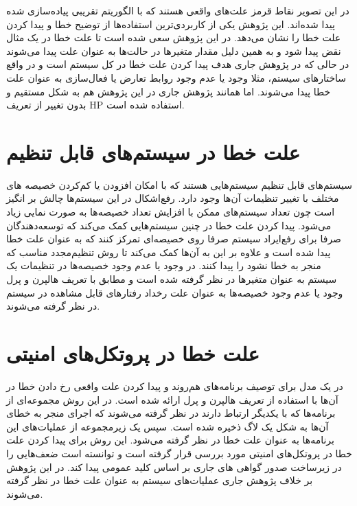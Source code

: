 در این تصویر نقاط قرمز علت‌های واقعی هستند که با الگوریتم تقریبی پیاده‌سازی شده پیدا شده‌اند.
 این پژوهش یکی از کاربردی‌ترین استفاده‌ها از توضیح خطا و پیدا کردن علت خطا را نشان می‌دهد. 
در این پژوهش سعی شده است تا علت خطا در یک مثال نقض پیدا شود و به همین دلیل مقدار متغیر‌ها در حالت‌ها به عنوان علت پیدا می‌شوند در حالی که در پژوهش جاری هدف پیدا کردن علت خطا در کل سیستم است و در واقع ساختار‌های سیستم، مثلا وجود یا عدم وجود روابط تعارض یا فعال‌سازی به عنوان علت خطا پیدا می‌شوند.
اما همانند پژوهش جاری در این پژوهش هم به شکل مستقیم و بدون تغییر از تعریف 
HP
استفاده شده است.

\section{علت خطا در سیستم‌های قابل تنظیم}
سیستم‌های قابل تنظیم%
سیستم‌هایی هستند که با امکان افزودن یا کم‌کردن خصیصه‌%
های مختلف با تغییر تنظیمات%
آن‌ها وجود دارد.
رفع‌اشکال در این سیستم‌ها چالش بر انگیز است چون تعداد سیستم‌های ممکن با افزایش تعداد خصیصه‌ها به صورت نمایی زیاد می‌شود.
پیدا کردن علت خطا در چنین سیستم‌هایی کمک می‌کند که توسعه‌دهندگان صرفا برای رفع‌ایراد سیستم صرفا روی خصیصه‌ای تمرکز کنند که به عنوان علت خطا پیدا شده است و علاوه بر این به آن‌ها کمک می‌کند تا روش تنظیم‌مجدد%
مناسب که منجر به خطا نشود را پیدا کنند.
در 
\cite{assmann2021tactile}
وجود یا عدم وجود خصیصه‌ها در تنظیمات یک سیستم به عنوان متغیر‌ها در نظر گرفته شده‌ است و مطابق با تعریف هالپرن و پرل وجود یا عدم وجود خصیصه‌ها به عنوان علت رخداد رفتار‌های قابل مشاهده در سیستم در نظر گرفته می‌شوند.

\section{علت خطا در پروتکل‌های امنیتی}
در
\cite{actions-cause}
یک مدل برای توصیف برنامه‌های هم‌روند و پیدا کردن علت واقعی رخ دادن خطا در آن‌ها با استفاده از تعریف هالپرن و پرل ارائه شده است.
در این روش مجموعه‌ای از برنامه‌ها که با یکدیگر ارتباط دارند در نظر گرفته می‌شوند که اجرای منجر به خطای آن‌ها به شکل یک لاگ%
ذخیره شده است.
سپس یک زیرمجموعه از عملیات‌های این برنامه‌ها به عنوان علت خطا در نظر گرفته می‌شود.
این روش برای پیدا کردن علت خطا در پروتکل‌های امنیتی مورد بررسی قرار گرفته است و توانسته است ضعف‌هایی را در زیرساخت صدور گواهی%
های جاری بر اساس کلید عمومی%
پیدا کند.
در این پژوهش بر خلاف پژوهش جاری عملیات‌های سیستم به عنوان علت خطا در نظر گرفته می‌شوند. 


